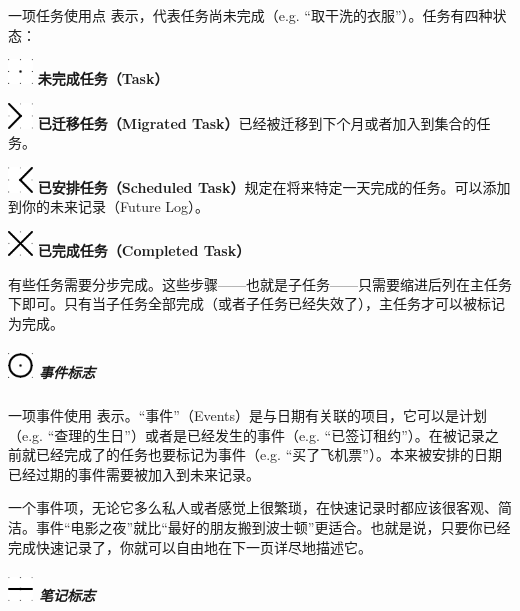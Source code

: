 \documentclass[a5paper]{article}
\begin{document}
一项任务使用点 \textbullet 表示，代表任务尚未完成（e.g. “取干洗的衣服”）。任务有四种状态：

\includegraphics[width=0.05\textwidth]{image/task.pdf} \textbf{未完成任务（Task）}

\includegraphics[width=0.05\textwidth]{image/migrated-task.pdf} \textbf{已迁移任务（Migrated Task）}已经被迁移到下个月或者加入到集合的任务。

\includegraphics[width=0.05\textwidth]{image/scheduled-task.pdf} \textbf{已安排任务（Scheduled Task）}规定在将来特定一天完成的任务。可以添加到你的未来记录（Future Log）。

\includegraphics[width=0.05\textwidth]{image/completed-task.pdf} \textbf{已完成任务（Completed Task）}

有些任务需要分步完成。这些步骤——也就是子任务——只需要缩进后列在主任务下即可。只有当子任务全部完成（或者子任务已经失效了），主任务才可以被标记为完成。

\clearpage

\subparagraph{\protect\includegraphics[width=0.05\textwidth]{image/event.pdf} 事件标志}

一项事件使用 \textbigcircle 表示。“事件”（Events）是与日期有关联的项目，它可以是计划（e.g. “查理的生日”）或者是已经发生的事件（e.g. “已签订租约”）。在被记录之前就已经完成了的任务也要标记为事件（e.g. “买了飞机票”）。本来被安排的日期已经过期的事件需要被加入到未来记录。

一个事件项，无论它多么私人或者感觉上很繁琐，在快速记录时都应该很客观、简洁。事件“电影之夜”就比“最好的朋友搬到波士顿”更适合。也就是说，只要你已经完成快速记录了，你就可以自由地在下一页详尽地描述它。

\subparagraph{\protect\includegraphics[width=0.05\textwidth]{image/note.pdf} 笔记标志}
\end{document}
